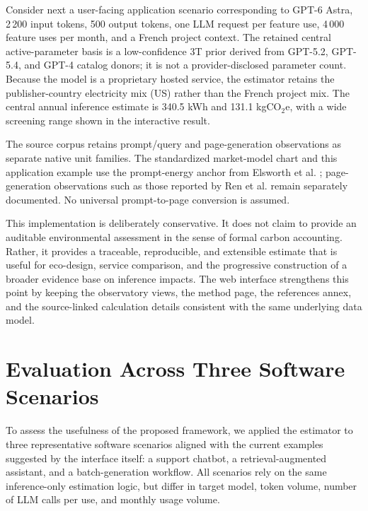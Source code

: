 \documentclass[11pt,a4paper]{article}
\begin{document}
Consider next a user-facing application scenario corresponding to GPT-6 Astra, 2\,200 input tokens, 500 output tokens, one LLM request per feature use, 4\,000 feature uses per month, and a French project context. The retained central active-parameter basis is a low-confidence 3T prior derived from GPT-5.2, GPT-5.4, and GPT-4 catalog donors; it is not a provider-disclosed parameter count. Because the model is a proprietary hosted service, the estimator retains the publisher-country electricity mix (US) rather than the French project mix. The central annual inference estimate is 340.5 kWh and 131.1 kgCO$_2$e, with a wide screening range shown in the interactive result.

The source corpus retains prompt/query and page-generation observations as separate native unit families. The standardized market-model chart and this application example use the prompt-energy anchor from Elsworth et al. \cite{elsworth2025}; page-generation observations such as those reported by Ren et al. \cite{ren2024} remain separately documented. No universal prompt-to-page conversion is assumed.

This implementation is deliberately conservative. It does not claim to provide an auditable environmental assessment in the sense of formal carbon accounting. Rather, it provides a traceable, reproducible, and extensible estimate that is useful for eco-design, service comparison, and the progressive construction of a broader evidence base on inference impacts. The web interface strengthens this point by keeping the observatory views, the method page, the references annex, and the source-linked calculation details consistent with the same underlying data model.

\section{Evaluation Across Three Software Scenarios}
To assess the usefulness of the proposed framework, we applied the estimator to three representative software scenarios aligned with the current examples suggested by the interface itself: a support chatbot, a retrieval-augmented assistant, and a batch-generation workflow. All scenarios rely on the same inference-only estimation logic, but differ in target model, token volume, number of LLM calls per use, and monthly usage volume.
\end{document}
